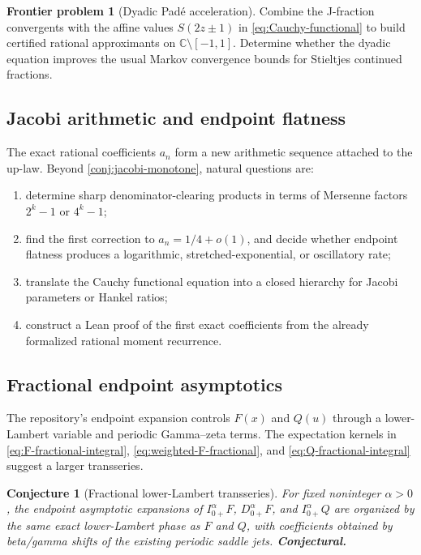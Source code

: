 \documentclass[11pt,oneside]{article}
\numberwithin{equation}{section}
\newtheorem{conjecture}[theorem]{Conjecture}
\theoremstyle{definition}
\newtheorem{problem}[theorem]{Frontier problem}
\theoremstyle{remark}
\newcommand{\C}{\mathbb C}
\newcommand{\statusconjecture}{\textcolor{conjecturered}{\textbf{Conjectural.}}}
\begin{document}
\begin{problem}[Dyadic Pad\'e acceleration]
Combine the J-fraction convergents with the affine values
\(S(2z\pm1)\) in \eqref{eq:Cauchy-functional} to build certified rational
approximants on \(\C\setminus[-1,1]\).  Determine whether the dyadic equation
improves the usual Markov convergence bounds for Stieltjes continued fractions.
\end{problem}

\subsection{Jacobi arithmetic and endpoint flatness}

The exact rational coefficients \(a_n\) form a new arithmetic sequence attached
to the up-law.  Beyond \cref{conj:jacobi-monotone}, natural questions are:
\begin{enumerate}
\item determine sharp denominator-clearing products in terms of Mersenne
      factors \(2^k-1\) or \(4^k-1\);
\item find the first correction to \(a_n=1/4+o(1)\), and decide whether endpoint
      flatness produces a logarithmic, stretched-exponential, or oscillatory
      rate;
\item translate the Cauchy functional equation into a closed hierarchy for
      Jacobi parameters or Hankel ratios;
\item construct a Lean proof of the first exact coefficients from the already
      formalized rational moment recurrence.
\end{enumerate}

\subsection{Fractional endpoint asymptotics}

The repository's endpoint expansion controls \(F(x)\) and \(Q(u)\) through a
lower-Lambert variable and periodic Gamma--zeta terms.  The expectation kernels
in \eqref{eq:F-fractional-integral}, \eqref{eq:weighted-F-fractional}, and
\eqref{eq:Q-fractional-integral} suggest a larger transseries.

\begin{conjecture}[Fractional lower-Lambert transseries]
For fixed noninteger \(\alpha>0\), the endpoint asymptotic expansions of
\(I_{0+}^{\alpha}F\), \(D_{0+}^{\alpha}F\), and
\(I_{0+}^{\alpha}Q\) are organized by the same exact lower-Lambert phase as
\(F\) and \(Q\), with coefficients obtained by beta/gamma shifts of the
existing periodic saddle jets.
\statusconjecture
\end{conjecture}
\end{document}
